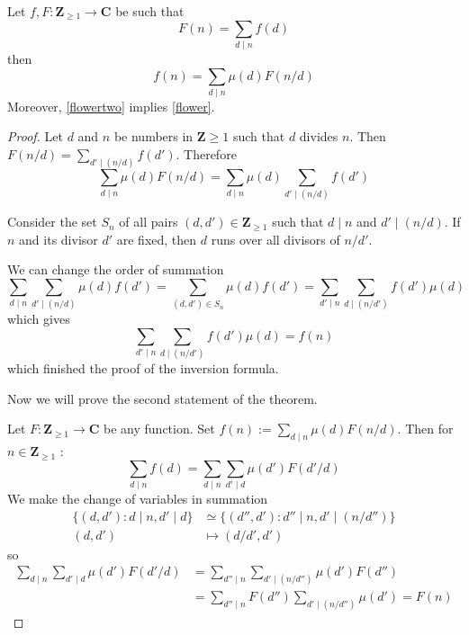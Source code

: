 \begin{theorem}
Let $f,F:\mathbf{Z}_{\ge 1}\to \mathbf{C}$ be such that 
\begin{equation}
F(n)=\sum _{d\mid n}f(d) \label{flower}
\end{equation}
then
\begin{equation}
f(n)=\sum _{d\mid n}\mu (d)F(n/d)\label{flowertwo}
\end{equation}
Moreover, \ref{flowertwo} implies \ref{flower}.
\end{theorem}
\begin{proof}
Let $d$ and $n$ be numbers in $\mathbf{Z}\ge 1$ such that $d$ divides $n$. Then $F(n/d)=\sum _{d'\mid (n/d)} f(d')$. Therefore
$$
\sum _{d\mid n}\mu(d)F(n/d)=\sum _{d\mid n}\mu(d)\sum _{d'\mid (n/d)}f(d')
$$

Consider the set $S_{n}$ of all pairs $(d,d')\in \mathbf{Z}_{\ge1}$ such that $d\mid n$ and $d' \mid (n/d)$. If $n$ and its divisor $d'$ are fixed, then $d$ runs over all divisors of $n/d'$.

We can change the order of summation
$$
\sum _{d\mid n}\sum _{d'\mid (n/d)} \mu(d)f(d')=\sum _{(d,d')\in S_{n}}\mu(d)f(d')=\sum _{d'\mid n}\sum _{d\mid (n/d')}f(d')\mu(d)
$$
which gives
$$
\sum _{d'\mid n}\sum _{d \mid (n/d')}f(d')\mu (d)=f(n)
$$
which finished the proof of the inversion formula.

Now we will prove the second statement of the theorem. 

Let $F:\mathbf{Z}_{\ge 1}\to \mathbf{C}$ be any function. Set $f(n):=\sum _{d\mid n}\mu(d)F(n/d)$. Then for $n\in \mathbf{Z}_{\ge 1}$ :
$$
\sum _{d\mid n}f(d)=\sum _{d\mid n}\sum _{d'\mid d}\mu(d')F(d'/d)
$$
We make the change of variables in summation 
\begin{align*}
\{ (d,d'):d\mid n, d'\mid d \} & \simeq \{ (d'',d'):d''\mid n, d'\mid(n/d'') \} \\
(d,d') & \mapsto(d/d',d')
\end{align*}
so
\begin{align*}
\sum _{d\mid n}\sum _{d'\mid d}\mu(d')F(d'/d) & =\sum _{d''\mid n}\sum _{d' \mid (n/d'')} \mu(d')F(d'') \\
 & =\sum _{d''\mid n} F(d'')\sum _{d'\mid(n/d'')}\mu (d')=F(n)
\end{align*}
\end{proof}
